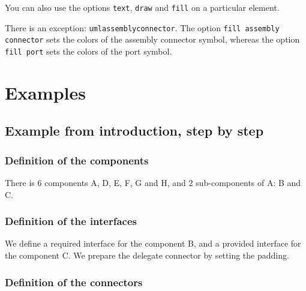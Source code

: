 \documentclass[a4paper,11pt]{report}
\begin{document}
You can also use the options {\tt text}, {\tt draw} and {\tt fill} on a particular element.

There is an exception: {\tt umlassemblyconnector}. The option {\tt fill assembly connector} sets the colors of the assembly connector symbol, whereas the option {\tt fill port} sets the colors of the port symbol.

\section{Examples}

\subsection{Example from introduction, step by step}

\subsubsection{Definition of the components}

There is 6 components A, D, E, F, G and H, and 2 sub-components of A: B and C.

\medskip



\begin{center}
\end{center}

\subsubsection{Definition of the interfaces}

We define a required interface for the component B, and a provided interface for the component C. We prepare the delegate connector by setting the padding.

\medskip

\vspace{-0.4cm}
{\color{red!70!black} \vspace{-0.4cm}}


\begin{center}
\end{center}

\subsubsection{Definition of the connectors}
\end{document}

